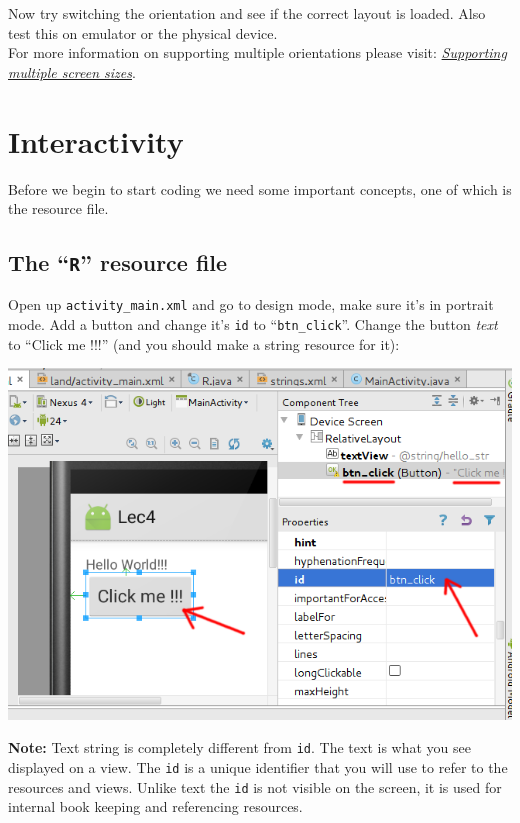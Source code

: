 Now try switching the orientation and see if the correct layout is loaded. Also test this on emulator or the physical device. \\

For more information on supporting multiple orientations please visit: \href{https://developer.android.com/training/multiscreen/screensizes.html}{\textit{Supporting multiple screen sizes}}.

\section{Interactivity}
Before we begin to start coding we need some important concepts, one of which is the resource file.

\subsection{The ``\textbf{\texttt{R}}'' resource file}

Open up \texttt{activity\_main.xml} and go to design mode, make sure it's in portrait mode. Add a button and change it's \texttt{id} to ``\texttt{btn\_click}''. Change the button \textit{text} to ``Click me !!!'' (and you should make a string resource for it):

\begin{center}
	\includegraphics[scale=0.4]{chapters/ch04/images/30}
\end{center}

\textbf{Note:} Text string is completely different from \texttt{id}. The text is what you see displayed on a view. The \texttt{id} is a unique identifier that you will use to refer to the resources and views. Unlike text the \texttt{id} is not visible on the screen, it is used for internal book keeping and referencing resources. \\

